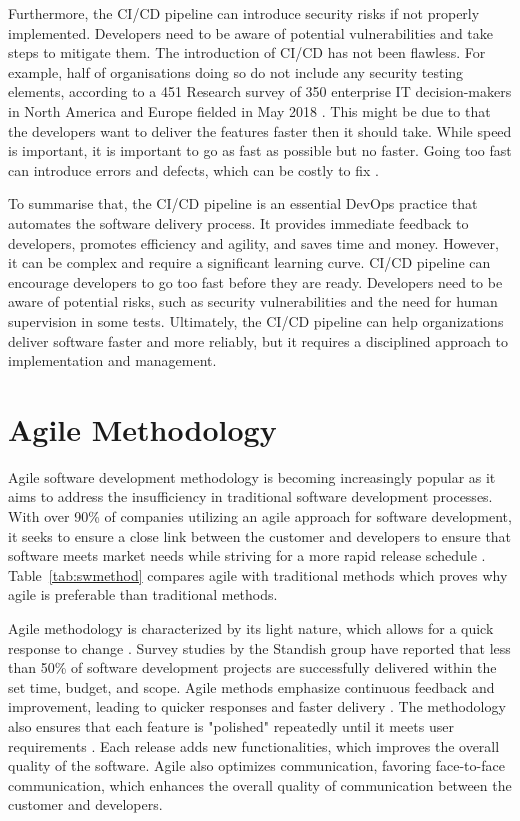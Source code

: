 Furthermore, the CI/CD pipeline can introduce security risks if not properly implemented. Developers need to be aware of potential vulnerabilities and take steps to mitigate them. The introduction of CI/CD has not been flawless. For example, half of organisations doing so do not include any security testing elements, according to a 451 Research survey of 350 enterprise IT decision-makers in North America and Europe fielded in May 2018 \cite{clark}. This might be due to that the developers want to deliver the features faster then it should take. While speed is important, it is important to go as fast as possible but no faster. Going too fast can introduce errors and defects, which can be costly to fix \cite{clark}. 

To summarise that, the CI/CD pipeline is an essential DevOps practice that automates the software delivery process. It provides immediate feedback to developers, promotes efficiency and agility, and saves time and money. However, it can be complex and require a significant learning curve. CI/CD pipeline can encourage developers to go too fast before they are ready. Developers need to be aware of potential risks, such as security vulnerabilities and the need for human supervision in some tests. Ultimately, the CI/CD pipeline can help organizations deliver software faster and more reliably, but it requires a disciplined approach to implementation and management.

\section{Agile Methodology}
Agile software development methodology is becoming increasingly popular as it aims to address the insufficiency in traditional software development processes. With over 90\% of companies utilizing an agile approach for software development, it seeks to ensure a close link between the customer and developers to ensure that software meets market needs while striving for a more rapid release schedule \cite{hlrf}. Table~\ref{tab:swmethod} compares agile with traditional methods which proves why agile is preferable than traditional methods.

Agile methodology is characterized by its light nature, which allows for a quick response to change \cite{koch}. Survey studies by the Standish group have reported that less than 50\% of software development projects are successfully delivered within the set time, budget, and scope. Agile methods emphasize continuous feedback and improvement, leading to quicker responses and faster delivery \cite{dragos}. The methodology also ensures that each feature is "polished" repeatedly until it meets user requirements \cite{aaa}. Each release adds new functionalities, which improves the overall quality of the software. Agile also optimizes communication, favoring face-to-face communication, which enhances the overall quality of communication between the customer and developers\cite{koch}.

